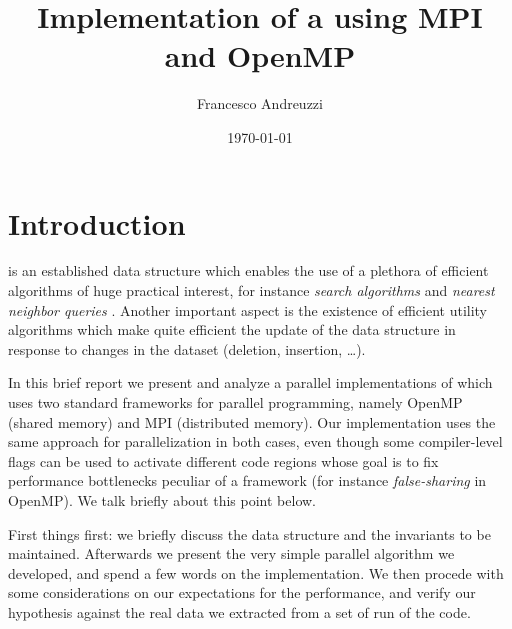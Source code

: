 \documentclass{article}
\title{Implementation of a \kdtree{} using MPI and OpenMP}
\author{Francesco Andreuzzi}
\date{\today}
\begin{document}
\maketitle

\tableofcontents


\section{Introduction} \label{sec:intro}
\kdtree{} is an established data structure which enables the use of a
plethora of efficient algorithms of huge practical interest, for instance
\emph{search algorithms} and \emph{nearest neighbor queries}
\cite{bentley1975multidimensional}. Another important aspect is the existence of
efficient utility algorithms which make quite efficient the update of the data
structure in response to changes in the dataset (deletion, insertion, \dots).

In this brief report we present and analyze a parallel implementations of
\kdtree{} which uses two standard frameworks for parallel programming, namely
OpenMP \cite{dagum1998openmp} (shared memory) and MPI \cite{mpi} (distributed
memory). Our implementation uses the same approach for parallelization in
both cases, even though some compiler-level flags can be used to activate
different code regions whose goal is to fix performance bottlenecks peculiar of
a framework (for instance \emph{false-sharing} in OpenMP). We talk
briefly about this point below.

First things first: we briefly discuss the data structure and the invariants to
be maintained. Afterwards we present the very simple parallel algorithm we
developed, and spend a few words on the implementation. We then procede with
some considerations on our expectations for the performance, and verify our
hypothesis against the real data we extracted from a set of run of the code.
\end{document}
